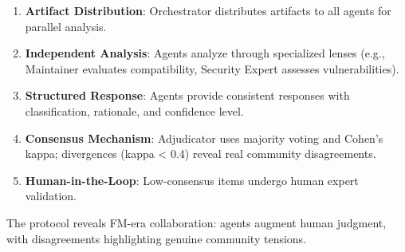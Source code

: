 \begin{enumerate}
    \item \textbf{Artifact Distribution}: Orchestrator distributes artifacts to all agents for parallel analysis.

    \item \textbf{Independent Analysis}: Agents analyze through specialized lenses (e.g., Maintainer evaluates compatibility, Security Expert assesses vulnerabilities).

    \item \textbf{Structured Response}: Agents provide consistent responses with classification, rationale, and confidence level.

    \item \textbf{Consensus Mechanism}: Adjudicator uses majority voting and Cohen's kappa; divergences (kappa < 0.4) reveal real community disagreements.

    \item \textbf{Human-in-the-Loop}: Low-consensus items undergo human expert validation.

\end{enumerate}

The protocol reveals FM-era collaboration: agents augment human judgment, with disagreements highlighting genuine community tensions.

% 
